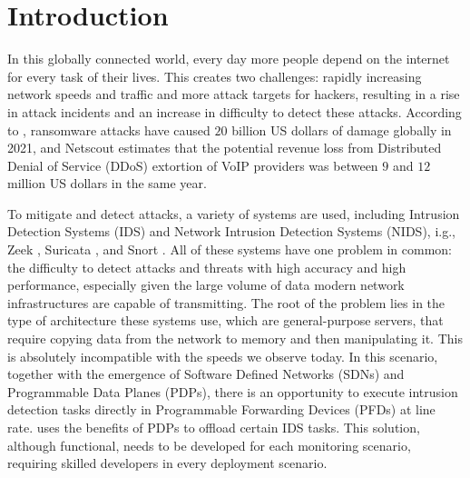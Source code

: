 \chapter{Introduction}
\label{cap:introduction}


In this globally connected world, every day more people depend on the internet for every task of their lives. This creates two challenges: rapidly increasing network speeds and traffic and more attack targets for hackers, resulting in a rise in attack incidents and an increase in difficulty to detect these attacks. According to , ransomware attacks have caused $20$ billion US dollars of damage globally in 2021, and Netscout \cite{NetscoutTIR2021} estimates that the potential revenue loss from Distributed Denial of Service (DDoS) extortion of VoIP providers was between $9$ and $12$ million US dollars in the same year.


To mitigate and detect attacks, a variety of systems are used, including Intrusion Detection Systems (IDS) and Network Intrusion Detection Systems (NIDS), i.g., Zeek \cite{Paxson1999}, Suricata \cite{SuricataWebsite}, and Snort \cite{SnortWebsite}. All of these systems have one problem in common: the difficulty to detect attacks and threats with high accuracy and high performance, especially given the large volume of data modern network infrastructures are capable of transmitting. The root of the problem lies in the type of architecture these systems use, which are general-purpose servers, that require copying data from the network to memory and then manipulating it. This is absolutely incompatible with the speeds we observe today. In this scenario, together with the emergence of Software Defined Networks (SDNs) and Programmable Data Planes (PDPs), there is an opportunity to execute intrusion detection tasks directly in Programmable Forwarding Devices (PFDs) at line rate.  uses the benefits of PDPs to offload certain IDS tasks. This solution, although functional, needs to be developed for each monitoring scenario, requiring skilled developers in every deployment scenario.





